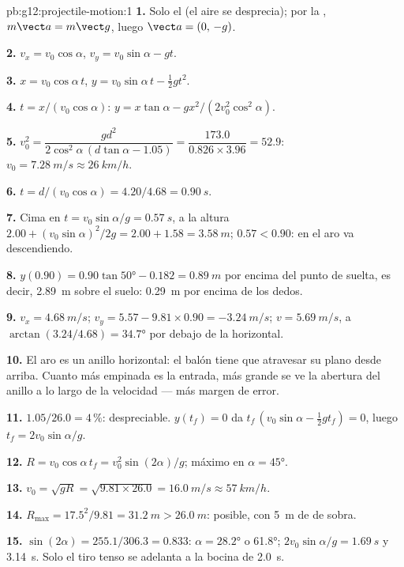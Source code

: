 \begin{solution}{pb:g12:projectile-motion:1}
\textbf{1.} Solo el  (el aire se desprecia); por la , $m\vect a = m\vect g$, luego $\vect a = (0,\,-g)$.

\textbf{2.} $v_x = v_0\cos\alpha$, $v_y = v_0\sin\alpha - gt$.

\textbf{3.} $x = v_0\cos\alpha\, t$,
$y = v_0\sin\alpha\, t - \tfrac12 gt^2$.

\textbf{4.} $t = x/(v_0\cos\alpha)$:
$y = x\tan\alpha - g x^2/(2v_0^2\cos^2\alpha)$.

\textbf{5.} $v_0^2 = \dfrac{g d^2}{2\cos^2\alpha\,(d\tan\alpha -
1.05)} = \dfrac{173.0}{0.826 \times 3.96} = 52.9$:
$v_0 = \qty{7.28}{m/s} \approx \qty{26}{km/h}$.

\textbf{6.} $t = d/(v_0\cos\alpha) = 4.20/4.68 = \qty{0.90}{s}$.

\textbf{7.} Cima en $t = v_0\sin\alpha/g = \qty{0.57}{s}$, a la altura
$2.00 + (v_0\sin\alpha)^2/2g = 2.00 + 1.58 = \qty{3.58}{m}$;
$0.57 < 0.90$: en el aro va descendiendo.

\textbf{8.} $y(0.90) = 0.90\tan\ang{50} - 0.182 = \qty{0.89}{m}$ por
encima del punto de suelta, es decir, \qty{2.89}{m} sobre el suelo:
\qty{0.29}{m} por encima de los dedos.

\textbf{9.} $v_x = \qty{4.68}{m/s}$;
$v_y = 5.57 - 9.81 \times 0.90 = \qty{-3.24}{m/s}$;
$v = \qty{5.69}{m/s}$, a $\arctan(3.24/4.68) = \ang{34.7}$ por debajo de
la horizontal.

\textbf{10.} El aro es un anillo horizontal: el balón tiene que
atravesar su plano desde arriba. Cuanto más empinada es la entrada, más
grande se ve la abertura del anillo a lo largo de la velocidad --- más
margen de error.

\textbf{11.} $1.05/26.0 = 4\,\%$: despreciable. $y(t_f) = 0$ da
$t_f\,(v_0\sin\alpha - \tfrac12 g t_f) = 0$, luego
$t_f = 2v_0\sin\alpha/g$.

\textbf{12.} $R = v_0\cos\alpha\, t_f = v_0^2\sin(2\alpha)/g$; máximo en
$\alpha = \ang{45}$.

\textbf{13.} $v_0 = \sqrt{gR} = \sqrt{9.81 \times 26.0} =
\qty{16.0}{m/s} \approx \qty{57}{km/h}$.

\textbf{14.} $R_{\max} = 17.5^2/9.81 = \qty{31.2}{m} > \qty{26.0}{m}$:
posible, con \qty{5}{m} de  de sobra.

\textbf{15.} $\sin(2\alpha) = 255.1/306.3 = 0.833$: $\alpha =
\ang{28.2}$ o \ang{61.8};  $2v_0\sin\alpha/g =
\qty{1.69}{s}$ y \qty{3.14}{s}. Solo el tiro tenso se adelanta a la
bocina de \qty{2.0}{s}.


\end{solution}
